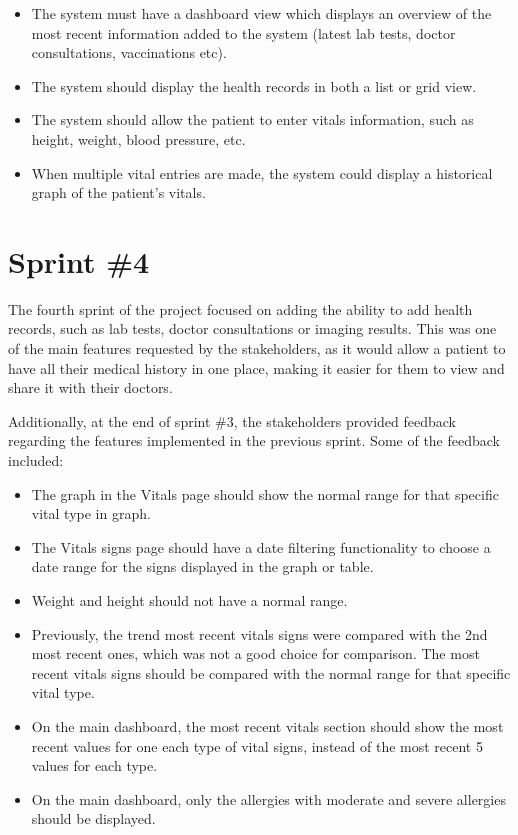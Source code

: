\begin{itemize}
    \item The system must have a dashboard view which displays an overview of the most recent information added to the system (latest lab tests, doctor consultations, vaccinations etc).
    \item The system should display the health records in both a list or grid view.
    \item The system should allow the patient to enter vitals information, such as height, weight, blood pressure, etc.
    \item When multiple vital entries are made, the system could display a historical graph of the patient's vitals.
\end{itemize}

\section{Sprint \#4}

The fourth sprint of the project focused on adding the ability to add health records, such as lab tests, doctor consultations or imaging results. This was one of the main features requested by the stakeholders, as it would allow a patient to have all their medical history in one place, making it easier for them to view and share it with their doctors.

Additionally, at the end of sprint \#3, the stakeholders provided feedback regarding the features implemented in the previous sprint. Some of the feedback included:

\begin{itemize}
    \item The graph in the Vitals page should show the normal range for that specific vital type in graph.
    \item The Vitals signs page should have a date filtering functionality to choose a date range for the signs displayed in the graph or table.
    \item Weight and height should not have a normal range.
    \item Previously, the trend most recent vitals signs were compared with the 2nd most recent ones, which was not a good choice for comparison. The most recent vitals signs should be compared with the normal range for that specific vital type.
    \item On the main dashboard, the most recent vitals section should show the most recent values for one each type of vital signs, instead of the most recent 5 values for each type.
    \item On the main dashboard, only the allergies with moderate and severe allergies should be displayed.
\end{itemize}

